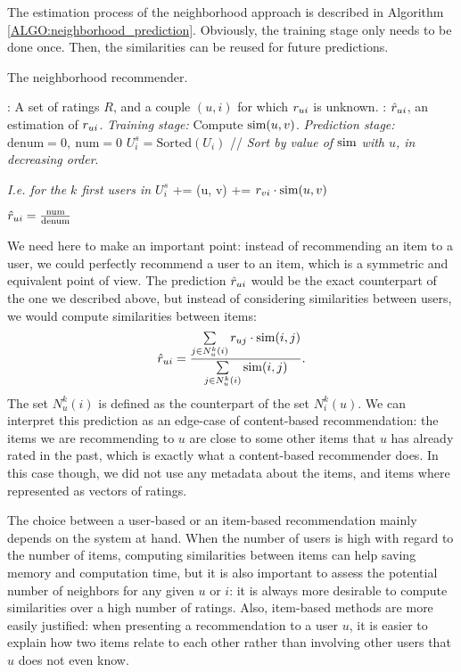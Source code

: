 The estimation process of the neighborhood approach is described in Algorithm
\ref{ALGO:neighborhood_prediction}.  Obviously, the training stage only needs
to be done once. Then, the
similarities can be reused for future predictions.

\begin{algorithm}[!ht]
 \caption{The neighborhood recommender.}
       \label{ALGO:neighborhood_prediction}
       \begin{algorithmic}

         : A set of ratings $R$, and a couple $(u, i)$ for
         which $r_{ui}$ is  unknown.
         : $\hat{r}_{ui}$, an estimation of $r_{ui}$.
         \STATE \textit{Training stage:}
         \STATE Compute $\text{sim}(u, v)$.
	    \ENDFOR
       \STATE \textit{Prediction stage:}
         \STATE $\text{denum} = 0, ~ \text{num} = 0$
         \STATE $U_i^s = \text{Sorted}(U_i)$  // \textit{Sort by value of
         $\text{sim}$ with $u$, in decreasing order}.

         \STATE \textit{I.e. for the  $k$ first users in $U_i^s$}
         \STATE {} += \ssim(u, v)
         \STATE {} += $r_{vi} \cdot \text{sim}(u, v)$
         \ENDFOR

         \STATE $\hat{r}_{ui} = \frac{\text{num}}{\text{denum}}$
\end{algorithmic}
\end{algorithm}

We need here to make an important point: instead of recommending an item to a
user, we could perfectly recommend a user to an item, which is a symmetric and
equivalent point of view. The prediction $\hat{r}_{ui}$ would be the exact counterpart of the one we
described above, but instead of considering similarities between users, we
would compute similarities between items:
$$\hat{r}_{ui} = \frac{\sum\limits_{j \in N_u^k(i)} r_{uj} \cdot \text{sim}(i, j)}
{\sum\limits_{j \in N_u^k(i)}\text{sim}(i, j)}.$$
The set $N_u^k(i)$ is defined as the counterpart of the set $N_i^k(u)$.
We can interpret this prediction as an edge-case of content-based
recommendation: the items we are recommending to $u$ are
close to some other items that $u$ has already rated in the past, which is exactly what a
content-based recommender does. In this case though, we did not use any
metadata about the items, and  items where represented as vectors of ratings.

The choice between a user-based or an item-based recommendation mainly depends on
the system at hand. When the number of users is high with regard to the number
of items, computing similarities between items can help saving memory and
computation time, but it is also important to assess the potential number of
neighbors for any given $u$ or $i$: it is always more desirable to compute
similarities over a high number of ratings. Also, item-based methods are
more easily justified: when presenting a recommendation to a user $u$, it is
easier to explain how two items relate to each other rather than involving
other users that $u$ does not even know.

